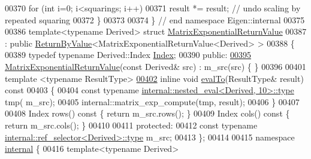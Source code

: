 \begin{DoxyCode}
00370   \textcolor{keywordflow}{for} (\textcolor{keywordtype}{int} i=0; i<squarings; i++)
00371     result *= result;   \textcolor{comment}{// undo scaling by repeated squaring}
00372 \}
00373 
00374 \} \textcolor{comment}{// end namespace Eigen::internal}
00375 
00386 \textcolor{keyword}{template}<\textcolor{keyword}{typename} Derived> \textcolor{keyword}{struct }\hyperlink{struct_eigen_1_1_matrix_exponential_return_value}{MatrixExponentialReturnValue}
00387 : \textcolor{keyword}{public} \hyperlink{group___core___module_class_eigen_1_1_return_by_value}{ReturnByValue}<MatrixExponentialReturnValue<Derived> >
00388 \{
00389     \textcolor{keyword}{typedef} \textcolor{keyword}{typename} Derived::Index \hyperlink{namespace_eigen_a62e77e0933482dafde8fe197d9a2cfde}{Index};
00390   \textcolor{keyword}{public}:
\hyperlink{struct_eigen_1_1_matrix_exponential_return_value_a4048419b1ee2befc51564703ba11acab}{00395}     \hyperlink{struct_eigen_1_1_matrix_exponential_return_value_a4048419b1ee2befc51564703ba11acab}{MatrixExponentialReturnValue}(\textcolor{keyword}{const} Derived& src) : m\_src(src) \{ \}
00396 
00401     \textcolor{keyword}{template} <\textcolor{keyword}{typename} ResultType>
\hyperlink{struct_eigen_1_1_matrix_exponential_return_value_a3dd2c65c7c6cdc41ab17415ee11899a0}{00402}     \textcolor{keyword}{inline} \textcolor{keywordtype}{void} \hyperlink{struct_eigen_1_1_matrix_exponential_return_value_a3dd2c65c7c6cdc41ab17415ee11899a0}{evalTo}(ResultType& result)\textcolor{keyword}{ const}
00403 \textcolor{keyword}{    }\{
00404       \textcolor{keyword}{const} \textcolor{keyword}{typename} \hyperlink{class_eigen_1_1internal_1_1_tensor_lazy_evaluator_writable}{internal::nested\_eval<Derived, 10>::type} tmp(
      m\_src);
00405       internal::matrix\_exp\_compute(tmp, result);
00406     \}
00407 
00408     Index rows()\textcolor{keyword}{ const }\{ \textcolor{keywordflow}{return} m\_src.rows(); \}
00409     Index cols()\textcolor{keyword}{ const }\{ \textcolor{keywordflow}{return} m\_src.cols(); \}
00410 
00411   \textcolor{keyword}{protected}:
00412     \textcolor{keyword}{const} \textcolor{keyword}{typename} \hyperlink{class_eigen_1_1internal_1_1_tensor_lazy_evaluator_writable}{internal::ref\_selector<Derived>::type} m\_src;
00413 \};
00414 
00415 \textcolor{keyword}{namespace }\hyperlink{namespaceinternal}{internal} \{
00416 \textcolor{keyword}{template}<\textcolor{keyword}{typename} Derived>

\end{DoxyCode}
